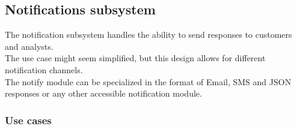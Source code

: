 \documentclass{article}
\begin{document}






	\pagebreak
	\subsection{Notifications subsystem}\label{subsec:Notifcations}
	The notification subsystem handles the ability to send responses to customers and analysts.\\ The use case might seem simplified, but this design allows for different notification channels. \\The notify module can be specialized in the format of Email, SMS and JSON responses or any other accessible notification module.
		\subsubsection{Use cases}
		
\end{document}
